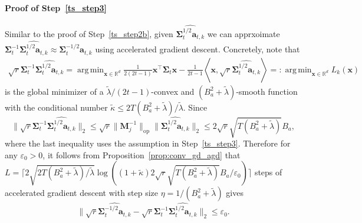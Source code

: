 \documentclass[10pt]{article}
\newcommand{\eps}{\varepsilon}
\DeclareMathOperator*{\argmin}{arg\,min}
\newcommand{\lops}[1]{\|{#1}\|_{\mathrm{op}}}
\newcommand{\<}{\left\langle}
\renewcommand{\>}{\right\rangle}
\newcommand{\R}{\mathbb{R}}
\newcommand{\Tpscov}{{{\mathbf\Sigma}}}
\newcommand{\Tpsparn}{{r}}
\newcommand{\padecond}{{\tilde \kappa}}
\newcommand{\intmat}{{\mathbf {M}}}
\def\ba{{\mathbf a}}
\def\bx{{\mathbf x}}
\begin{document}
\paragraph{Proof of Step~\ref{ts_step3}}
Similar to the proof of Step~\ref{ts_step2b}, given $\widehat{\Tpscov_t^{1/2}\ba_{t,k}}$ we can apprxoimate $\Tpscov_t^{-1}\widehat{\Tpscov_t^{1/2}\ba_{t,k}}\approx \Tpscov_t^{-1/2}\ba_{t,k}$ using accelerated gradient descent. Concretely, note that 
\begin{align*}
   \sqrt{\Tpsparn}\Tpscov_t^{-1}\widehat{\Tpscov_t^{1/2}\ba_{t,k}} =\argmin_{\bx\in\R^d}\frac{1}{2(2t-1)}\bx^\top\Tpscov_t\bx-\frac{1}{2t-1}\<\bx,  \sqrt{\Tpsparn}\widehat{\Tpscov_t^{1/2}\ba_{t,k}}\>=:\argmin_{\bx\in\R^d} L_{k}(\bx)
\end{align*}
is the global minimizer of a $\tilde\lambda/(2t-1)$-convex and $(B_a^2+\tilde\lambda)$-smooth function with the conditional number $\padecond\leq 2T(B_a^2+\tilde\lambda)/\tilde\lambda$. Since 
$$
\|\sqrt{\Tpsparn}\Tpscov_t^{-1}\widehat{\Tpscov_t^{1/2}\ba_{t,k}} \|_2\leq\sqrt{\Tpsparn}\lops{\intmat_j^{-1}}\|\widehat{\Tpscov_t^{1/2}\ba_{t,k}} \|_2\leq 2\sqrt{\Tpsparn}\sqrt{T(B_a^2+\tilde\lambda)}B_a,$$
where the last inequality uses the assumption in Step~\ref{ts_step3}.
Therefore for any $\eps_0>0$, it follows from Proposition~\ref{prop:conv_gd_agd} that
$L=\lceil2\sqrt{2 T(B_a^2+\tilde\lambda)/\tilde\lambda}\log((1+\padecond)2\sqrt{\Tpsparn}\sqrt{T(B_a^2+\tilde\lambda)}B_a/\eps_0)\rceil$ steps of accelerated gradient descent with step size $\eta=1/(B_a^2+\tilde\lambda)$ gives  $$\|\sqrt{\Tpsparn}\widehat{\Tpscov_t^{-1/2}\ba_{t,k}} -\sqrt{\Tpsparn}\Tpscov_t^{-1}\widehat{\Tpscov_t^{1/2}\ba_{t,k}} \|_2\leq\eps_0.$$ 
\end{document}
